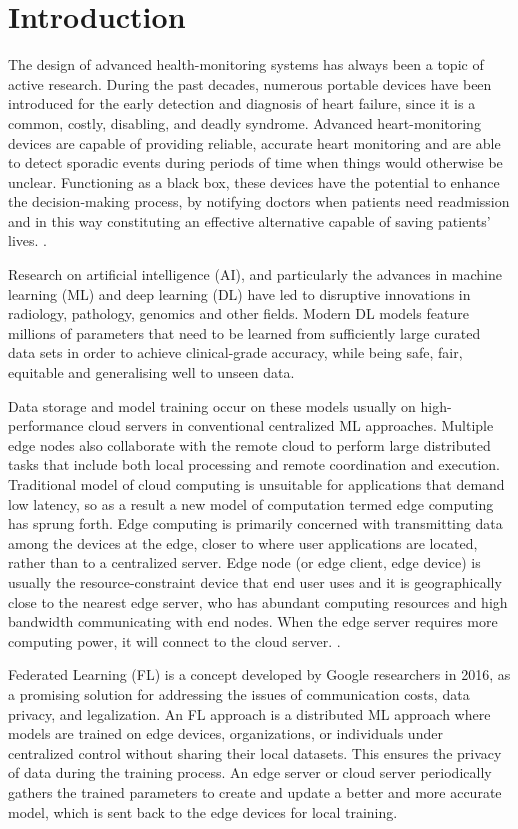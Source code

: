 \chapter{Introduction} \label{chap1}

The design of advanced health-monitoring systems has always been a topic of active research. During the past decades, numerous portable devices have been introduced for the early detection and diagnosis of heart failure, since it is a common, costly, disabling, and deadly syndrome. Advanced heart-monitoring devices are capable of providing reliable, accurate heart monitoring
and are able to detect sporadic events during periods of time when things would otherwise be unclear. Functioning as a black box, these devices have the potential to enhance the decision-making process, by notifying doctors when patients need readmission and in this way constituting an effective alternative capable of saving patients’ lives. \cite{a12020032}.

Research on artificial intelligence (AI), and particularly the advances in machine learning (ML) and deep learning (DL) have led to disruptive innovations in radiology, pathology, genomics and other fields. Modern DL models feature millions of parameters that need to be learned from sufficiently large curated data sets in order to achieve clinical-grade accuracy, while being safe, fair, equitable and generalising well to unseen data. \cite{Rieke_2020}

Data storage and model training occur on these models usually on high-performance cloud servers in conventional centralized ML approaches. Multiple edge nodes also collaborate with the remote cloud to perform large distributed tasks that include both local processing and remote coordination and execution. Traditional model of cloud computing is unsuitable for applications that demand low latency, so as a result a new model of computation termed edge computing has sprung forth. Edge computing is primarily concerned with transmitting data among the devices at the edge, closer to where user applications are located, rather than to a centralized server. Edge node (or edge client, edge device) is usually the resource-constraint device that
end user uses and it is geographically close to the nearest edge server,
who has abundant computing resources and high bandwidth communicating with end nodes. When the edge server requires more computing power, it will connect to the cloud server. \cite{fedrated_learning_as_edge_computing}. 


Federated Learning (FL) is a concept developed by Google researchers in 2016, as a promising solution for addressing the issues of communication costs, data privacy, and legalization. An FL approach is a distributed ML approach where models are trained on edge devices, organizations, or individuals under centralized control without sharing their local datasets. This ensures the privacy of data during the training process. An edge server or cloud server periodically gathers the trained parameters to create and update a better and more accurate model, which is sent back to the edge devices for local training. \cite{s22020450}

